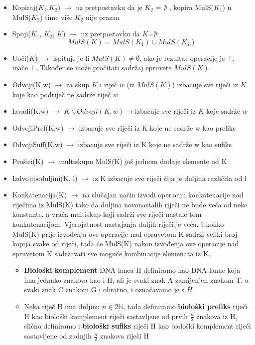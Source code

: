 \documentclass[12pt, a4paper]{book}
\begin{document}
\begin{spacing}{1.5}
\begin{defn}
    \begin{itemize}
        \item Kopiraj($K_1$,$K_2$) $\to$ uz pretpostavku da je $K_2$ = $\emptyset$ , kopira MulS($K_1$) u MulS($K_2$) time više $K_2$ nije prazan
        \item Spoji($K_1$, $K_2$, $K$) $\to$ uz pretpostavku da $K$=$\emptyset$: \[MulS(K)=MulS(K_1)\cup MulS(K_2) \]
        \item Uoči($K$) $\to$ ispituje je li $MulS(K)\neq\emptyset$, ako je rezultat operacije je $\top$, inače $\bot$. Također se može pročitati sadržaj epruvete $MulS(K)$.
        \item Odvoji(K,w) $\to$ za skup $K$ i riječ $w$ (iz $MulS(K)$) izbacuje sve riječi iz $K$ koje kao podriječ ne sadrže riječ $w$
        \item Izvadi(K,w) $\to$ $K\backslash Odvoji(K,w)\to $izbacuje sve riječi iz $K$ koje sadrže $w$
        \item Odvoji\textunderscore Pref(K,w) $\to$ izbacuje sve riječi iz K koje ne sadrže w kao prefiks
        \item Odvoji\textunderscore Suff(K,w) $\to$ izbacuje sve riječi iz K koje ne sadrže w kao sufiks
        \item Proširi(K) $\to$ multiskupu MulS(K) još jednom dodaje elemente od K
        \item Izdvoji\textunderscore po\textunderscore duljini(K, l) $\to$ iz K izbacuje sve riječi čija je duljina različita od l
        \item Konkatenacija(K) $\to$ na slučajan način izvodi operaciju konkatenacije nad riječima iz MulS(K) tako da duljina novonastalih riječi ne bude veća od neke konstante, a vraća multiskup koji sadrži sve riječi nastale tom konkatenacijom. Vjerojatnost nastajanja duljih riječi je veća. Ukoliko MulS(K) prije izvođenja ove operacije nad epruvetom K sadrži veliki broj kopija svake od riječi, tada će MulS(K) nakon izvođenja ove operacije nad epruvetom K sadržavati sve moguće kombinacije elemenata iz K.
            \begin{itemize}
                \item \textbf{Biološki komplement} DNA lanca H definiramo kao DNA lanac koja ima jednako znakova kao i H, ali je svaki znak A zamijenjen znakom T, a svaki znak C znakom G i obratno, i označavamo je s $\overline{H}$
                \item Neka riječ H ima duljinu $n \in 2\mathbb{N}$, tada definiramo \textbf{biološki prefiks} riječi H kao biološki komplement riječi sastavljene od prvih $\frac{n}{2}$ znakova iz H, slično definiramo i \textbf{biološki sufiks} riječi H kao biološki komplement riječi sastavljene od zadnjih $\frac{n}{2}$ znakova riječi H

\end{itemize}
\end{itemize}
\end{defn}
\end{spacing}
\end{document}
